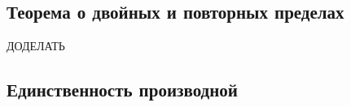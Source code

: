 \subsection{Теорема о двойных и повторных пределах}

ДОДЕЛАТЬ

\subsection{Единственность производной}

